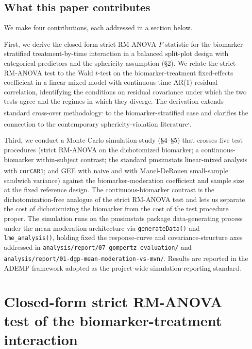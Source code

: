 \documentclass[
  11pt,
]{article}
\begin{document}
\subsection{What this paper contributes}\label{what-this-paper-contributes}

We make four contributions, each addressed in a section below.

First, we derive the closed-form strict RM-ANOVA \(F\)-statistic
for the biomarker-stratified treatment-by-time interaction in a
balanced split-plot design with categorical predictors and the
sphericity assumption (\S2). We relate the strict-RM-ANOVA test
to the Wald \(t\)-test on the biomarker-treatment
fixed-effects coefficient in a linear mixed model with
continuous-time AR(1) residual correlation, identifying the
conditions on residual covariance under which the two tests agree
and the regimes in which they diverge. The derivation extends
standard cross-over methodology\textsuperscript{,} to the biomarker-stratified case and clarifies
the connection to the contemporary sphericity-violation literature\textsuperscript{,}.

Third, we conduct a Monte Carlo simulation study (\S4--\S5) that
crosses five test procedures (strict RM-ANOVA on the dichotomized
biomarker; a continuous-biomarker within-subject contrast; the
standard pmsimstats linear-mixed analysis with \texttt{corCAR1}; and GEE
with naive and with Mancl-DeRouen\textsuperscript{}
small-sample sandwich variance) against the biomarker-moderation
coefficient and sample size at the fixed reference design. The
continuous-biomarker contrast is the dichotomization-free
analogue of the strict RM-ANOVA test and lets us separate the
cost of dichotomizing the biomarker from the cost of the test
procedure proper. The simulation runs on the pmsimstats package
data-generating process under the mean-moderation architecture
via \texttt{generateData()} and \texttt{lme\_analysis()}, holding fixed the
response-curve and covariance-structure axes addressed in
\texttt{analysis/report/07-gompertz-evaluation/} and
\texttt{analysis/report/01-dgp-mean-moderation-vs-mvn/}. Results are
reported in the\textsuperscript{} ADEMP framework adopted as the
project-wide simulation-reporting standard.

\section{Closed-form strict RM-ANOVA test of the biomarker-treatment interaction}\label{closed-form-strict-rm-anova-test-of-the-biomarker-treatment-interaction}
\end{document}

